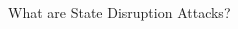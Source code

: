 \begin{frame}{What are State Disruption Attacks?}
\begin{columns}
        \hfill
        \begin{column}{.3\linewidth}
        \end{column}
      \end{columns}
\end{frame}


